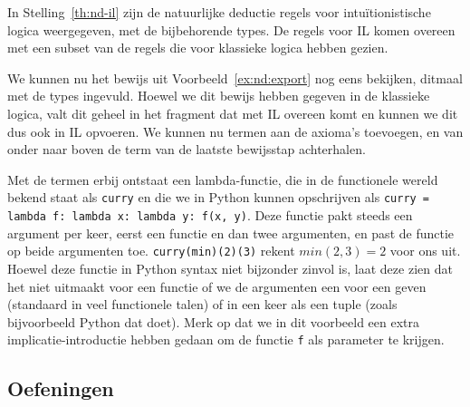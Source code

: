 In Stelling~\ref{th:nd-il} zijn de natuurlijke deductie regels voor intu\"itionistische logica weergegeven, met de bijbehorende types. De regels voor IL komen overeen met een subset van de regels die voor klassieke logica hebben gezien. 

We kunnen nu het bewijs uit Voorbeeld~\ref{ex:nd:export} nog eens bekijken, ditmaal met de types ingevuld. Hoewel we dit bewijs hebben gegeven in de klassieke logica, valt dit geheel in het fragment dat met IL overeen komt en kunnen we dit dus ook in IL opvoeren. We kunnen nu termen aan de axioma's toevoegen, en van onder naar boven de term van de laatste bewijsstap achterhalen.

\begin{example}\label{ex:typed}
\begin{prooftree}
\end{prooftree}
\end{example}

Met de termen erbij ontstaat een lambda-functie, die in de functionele wereld bekend staat als \texttt{curry} en die we in Python kunnen opschrijven als \verb|curry = lambda f: lambda x: lambda y: f(x, y)|. Deze functie pakt steeds een argument per keer, eerst een functie en dan twee argumenten, en past de functie op beide argumenten toe. \verb|curry(min)(2)(3)| rekent $min(2,3) = 2$ voor ons uit. Hoewel deze functie in Python syntax niet bijzonder zinvol is, laat deze zien dat het niet uitmaakt voor een functie of we de argumenten een voor een geven (standaard in veel functionele talen) of in een keer als een tuple (zoals bijvoorbeeld Python dat doet).  Merk op dat we in dit voorbeeld een extra implicatie-introductie hebben gedaan om de functie \texttt{f} als parameter te krijgen.

\subsection{Oefeningen}


